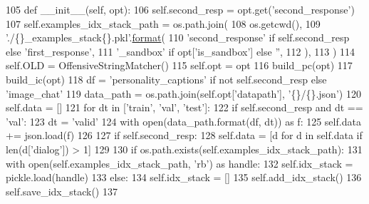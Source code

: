 \begin{DoxyCode}
105     \textcolor{keyword}{def }\_\_init\_\_(self, opt):
106         self.second\_resp = opt.get(\textcolor{stringliteral}{'second\_response'})
107         self.examples\_idx\_stack\_path = os.path.join(
108             os.getcwd(),
109             \textcolor{stringliteral}{'./\{\}\_examples\_stack\{\}.pkl'}.\hyperlink{namespaceparlai_1_1chat__service_1_1services_1_1messenger_1_1shared__utils_a32e2e2022b824fbaf80c747160b52a76}{format}(
110                 \textcolor{stringliteral}{'second\_response'} \textcolor{keywordflow}{if} self.second\_resp \textcolor{keywordflow}{else} \textcolor{stringliteral}{'first\_response'},
111                 \textcolor{stringliteral}{'\_sandbox'} \textcolor{keywordflow}{if} opt[\textcolor{stringliteral}{'is\_sandbox'}] \textcolor{keywordflow}{else} \textcolor{stringliteral}{''},
112             ),
113         )
114         self.OLD = OffensiveStringMatcher()
115         self.opt = opt
116         build\_pc(opt)
117         build\_ic(opt)
118         df = \textcolor{stringliteral}{'personality\_captions'} \textcolor{keywordflow}{if} \textcolor{keywordflow}{not} self.second\_resp \textcolor{keywordflow}{else} \textcolor{stringliteral}{'image\_chat'}
119         data\_path = os.path.join(self.opt[\textcolor{stringliteral}{'datapath'}], \textcolor{stringliteral}{'\{\}/\{\}.json'})
120         self.data = []
121         \textcolor{keywordflow}{for} dt \textcolor{keywordflow}{in} [\textcolor{stringliteral}{'train'}, \textcolor{stringliteral}{'val'}, \textcolor{stringliteral}{'test'}]:
122             \textcolor{keywordflow}{if} self.second\_resp \textcolor{keywordflow}{and} dt == \textcolor{stringliteral}{'val'}:
123                 dt = \textcolor{stringliteral}{'valid'}
124             with open(data\_path.format(df, dt)) \textcolor{keyword}{as} f:
125                 self.data += json.load(f)
126 
127         \textcolor{keywordflow}{if} self.second\_resp:
128             self.data = [d \textcolor{keywordflow}{for} d \textcolor{keywordflow}{in} self.data \textcolor{keywordflow}{if} len(d[\textcolor{stringliteral}{'dialog'}]) > 1]
129 
130         \textcolor{keywordflow}{if} os.path.exists(self.examples\_idx\_stack\_path):
131             with open(self.examples\_idx\_stack\_path, \textcolor{stringliteral}{'rb'}) \textcolor{keyword}{as} handle:
132                 self.idx\_stack = pickle.load(handle)
133         \textcolor{keywordflow}{else}:
134             self.idx\_stack = []
135             self.add\_idx\_stack()
136             self.save\_idx\_stack()
137 
\end{DoxyCode}


